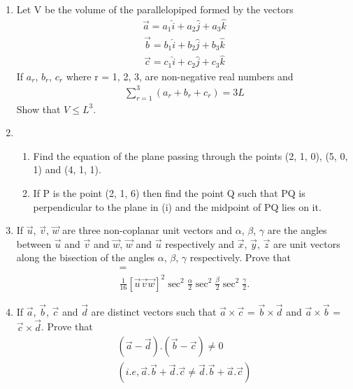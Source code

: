 \begin{enumerate}[label=\arabic*.,ref=\thesubsection.\theenumi]
\item Let V be the volume of the parallelopiped formed by the vectors
\begin{align*}
\overrightarrow{a} = a_1\hat{i} + a_2\hat{j} + a_3\hat{k}
\end{align*}
\begin{align*}
\overrightarrow{b} = b_1\hat{i} + b_2\hat{j} + b_3\hat{k}
\end{align*}
\begin{align*}
\overrightarrow{c} = c_1\hat{i} + c_2\hat{j} + c_3\hat{k}
\end{align*}
If $a_r$, $b_r$, $c_r$ where r = 1, 2, 3, are non-negative real numbers and 
\begin{align*}
\sum_{r=1}^{3}(a_r + b_r + c_r)=3L
\end{align*}
Show that $V \leq L^{3}$.

\item 
\begin{enumerate}
\item Find the equation of the plane passing through the points (2, 1, 0), (5, 0, 1) and (4, 1, 1).
\item If P is the point (2, 1, 6) then find the point Q such that PQ is perpendicular to the plane in (i) and the midpoint of PQ lies on it.
\end{enumerate}

\item If $\overrightarrow{u}$, $\overrightarrow{v}$, $\overrightarrow{w}$ are three non-coplanar unit vectors and $\alpha$, $\beta$, $\gamma$ are the angles between $\overrightarrow{u}$ and $\overrightarrow{v}$ and $\overrightarrow{w}$, $\overrightarrow{w}$ and $\overrightarrow{u}$ respectively and $\overrightarrow{x}$, $\overrightarrow{y}$, $\overrightarrow{z}$ are unit vectors along the bisection of the angles $\alpha$, $\beta$, $\gamma$ respectively. Prove that
\begin{align*}
[(\overrightarrow{x} \times \overrightarrow{y})  (\overrightarrow{y} \times \overrightarrow{z}) (\overrightarrow{z} \times \overrightarrow{x})] =\\
\frac{1}{16}[\overrightarrow{u}\overrightarrow{v}\overrightarrow{w}]^{2} \sec^{2}\frac{\alpha}{2}\sec^{2}\frac{\beta}{2}\sec^{2}\frac{\gamma}{2}.
\end{align*}

\item If $\overrightarrow{a}$, $\overrightarrow{b}$, $\overrightarrow{c}$ and $\overrightarrow{d}$ are distinct vectors such that $\overrightarrow{a} \times \overrightarrow{c}$ = $\overrightarrow{b} \times 
\overrightarrow{d}$ and $\overrightarrow{a} \times \overrightarrow{b}$ = $\overrightarrow{c} \times 
\overrightarrow{d}$. Prove that
\begin{align*}
(\overrightarrow{a} - \overrightarrow{d}).(\overrightarrow{b} - \overrightarrow{c}) \neq 0 \\
(i.e, \overrightarrow{a}.\overrightarrow{b}+\overrightarrow{d}.\overrightarrow{c} \neq \overrightarrow{d}.\overrightarrow{b}+\overrightarrow{a}.\overrightarrow{c})
\end{align*}


\end{enumerate}
